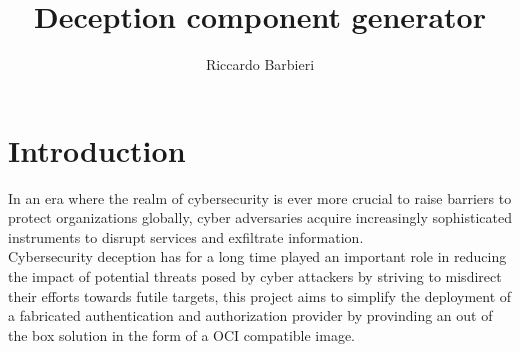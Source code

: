 \documentclass[12pt]{book}
\title{Deception component generator}
\author{Riccardo Barbieri}
\begin{document}
\maketitle

\section{Introduction}

In an era where the realm of cybersecurity is ever more crucial to raise barriers to protect organizations globally, cyber adversaries acquire increasingly sophisticated instruments to disrupt services and exfiltrate information.\\
Cybersecurity deception has for a long time played an important role in reducing the impact of potential threats posed by cyber attackers by striving to misdirect their efforts towards futile targets, this project aims to simplify the deployment of a fabricated authentication and authorization provider by provinding an out of the box solution in the form of a OCI compatible image.

\end{document}
